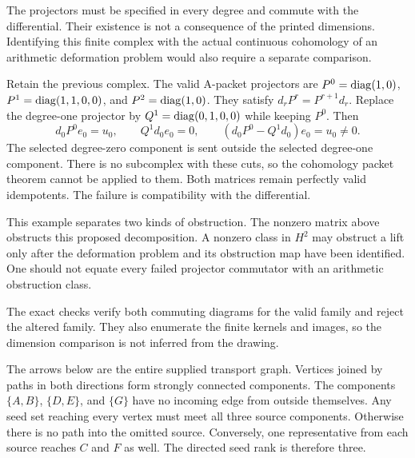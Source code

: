 The projectors must be specified in every degree and commute with the differential. Their existence is not a consequence of the printed dimensions. Identifying this finite complex with the actual continuous cohomology of an arithmetic deformation problem would also require a separate comparison.

Retain the previous complex. The valid A-packet projectors are $P^0=\operatorname{diag}(1,0)$, $P^1=\operatorname{diag}(1,1,0,0)$, and $P^2=\operatorname{diag}(1,0)$. They satisfy $d_rP^r=P^{r+1}d_r$.
Replace the degree-one projector by $Q^1=\operatorname{diag}(0,1,0,0)$ while keeping $P^0$. Then
\[
d_0P^0e_0=u_0,
\qquad Q^1d_0e_0=0,
\qquad(d_0P^0-Q^1d_0)e_0=u_0\ne0.
\]
The selected degree-zero component is sent outside the selected degree-one component. There is no subcomplex with these cuts, so the cohomology packet theorem cannot be applied to them. Both matrices remain perfectly valid idempotents. The failure is compatibility with the differential.

This example separates two kinds of obstruction. The nonzero matrix above obstructs this proposed decomposition. A nonzero class in $H^2$ may obstruct a lift only after the deformation problem and its obstruction map have been identified. One should not equate every failed projector commutator with an arithmetic obstruction class.

The exact checks verify both commuting diagrams for the valid family and reject the altered family. They also enumerate the finite kernels and images, so the dimension comparison is not inferred from the drawing.

The arrows below are the entire supplied transport graph. Vertices joined by paths in both directions form strongly connected components. The components $\{A,B\}$, $\{D,E\}$, and $\{G\}$ have no incoming edge from outside themselves.
Any seed set reaching every vertex must meet all three source components. Otherwise there is no path into the omitted source. Conversely, one representative from each source reaches $C$ and $F$ as well. The directed seed rank is therefore three.

